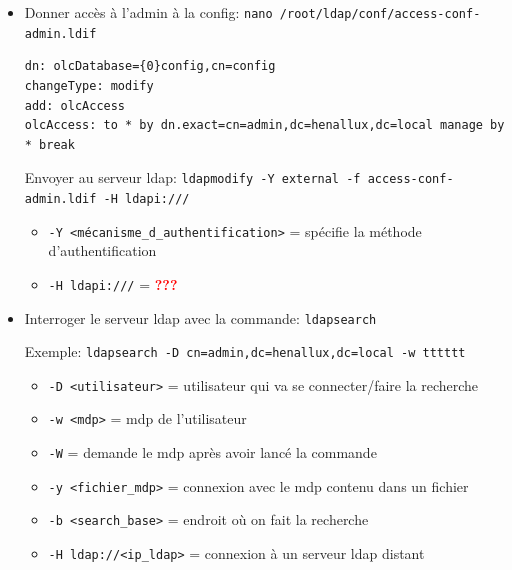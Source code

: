 \documentclass[a4paper]{article}
\begin{document}
\begin{itemize}
\item Donner accès à l'admin à la config: \texttt{nano /root/ldap/conf/access-conf-admin.ldif}
\begin{example} \begin{verbatim}
dn: olcDatabase={0}config,cn=config
changeType: modify
add: olcAccess
olcAccess: to * by dn.exact=cn=admin,dc=henallux,dc=local manage by * break
\end{verbatim} \end{example}
Envoyer au serveur ldap: \texttt{ldapmodify -Y external -f access-conf-admin.ldif -H ldapi:///}
\begin{example} \begin{itemize}
    \item \texttt{-Y <mécanisme\_d\_authentification>} = spécifie la méthode d'authentification
    \item \texttt{-H ldapi:///} = \textcolor{red}{\textbf{???}}
\end{itemize} \end{example}


\item Interroger le serveur ldap avec la commande: \texttt{ldapsearch}
\begin{example}
    Exemple: \texttt{ldapsearch -D cn=admin,dc=henallux,dc=local -w tttttt}
    \begin{itemize}
        \item \texttt{-D <utilisateur>} = utilisateur qui va se connecter/faire la recherche
        \item \texttt{-w <mdp>} = mdp de l'utilisateur
        \item \texttt{-W} = demande le mdp après avoir lancé la commande
        \item \texttt{-y <fichier\_mdp>} = connexion avec le mdp contenu dans un fichier
        \item \texttt{-b <search\_base>} = endroit où on fait la recherche
        \item \texttt{-H ldap://<ip\_ldap>} = connexion à un serveur ldap distant
    \end{itemize}
\end{example}



\end{itemize}
\end{document}

